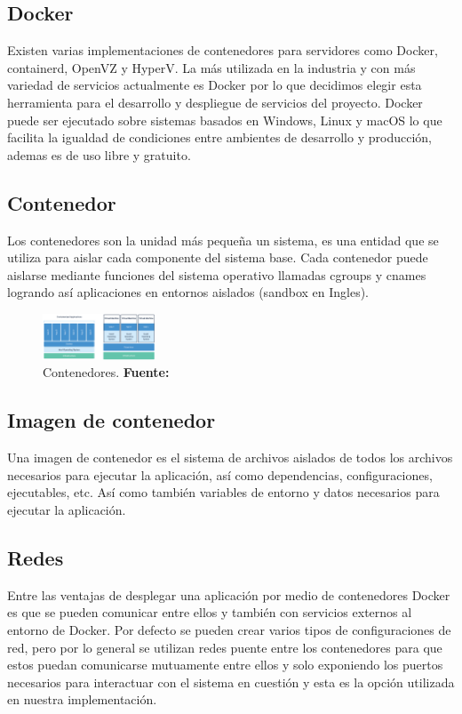 \subsection{Docker}

Existen varias implementaciones de contenedores para servidores como Docker, containerd, OpenVZ y
HyperV. La más utilizada en la industria y con más variedad de servicios actualmente es
Docker por lo que decidimos elegir esta herramienta para el desarrollo y despliegue de servicios del
proyecto. Docker puede ser ejecutado sobre sistemas basados en Windows, Linux y macOS lo que
facilita la igualdad de condiciones entre ambientes de desarrollo y producción, ademas es de uso
libre y gratuito. \cite{alternativas_docker}

\subsection{Contenedor}

Los contenedores son la unidad más pequeña un sistema, es una entidad que se utiliza para aislar
cada componente del sistema base. Cada contenedor puede aislarse mediante funciones del sistema
operativo llamadas cgroups y cnames logrando así aplicaciones en entornos aislados (sandbox en
Ingles). \cite{Docker}
\begin{figure}[H]
	\begin{centering}
		\includegraphics[angle=0,width=0.3\textwidth]{Figuras/docker-container.png}
		\par \end{centering}
	\caption[Contenedores]{Contenedores. \textbf{Fuente:} \cite{Docker}}
	\label{Contenedores}
\end{figure}

\subsection{Imagen de contenedor}
Una imagen de contenedor es el sistema de archivos aislados de todos los archivos necesarios para
ejecutar la aplicación, así como dependencias, configuraciones, ejecutables, etc. Así como también
variables de entorno y datos necesarios para ejecutar la aplicación. \cite{Docker}

\subsection{Redes}
Entre las ventajas de desplegar una aplicación por medio de contenedores Docker es que se pueden
comunicar entre ellos y también con servicios externos al entorno de Docker. Por defecto se pueden
crear varios tipos de configuraciones de red, pero por lo general se utilizan redes puente entre
los contenedores para que estos puedan comunicarse mutuamente entre ellos y solo exponiendo los
puertos necesarios para interactuar con el sistema en cuestión y esta es la opción utilizada en
nuestra implementación. \cite{Docker}


